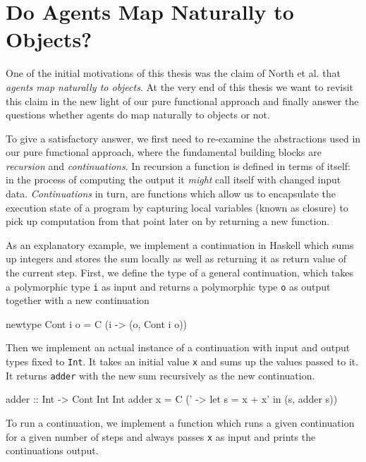\section{Do Agents Map Naturally to Objects?}
\label{sec:agents_to_objects}
One of the initial motivations of this thesis was the claim of North et al. \cite{north_managing_2007} that \textit{agents map naturally to objects}. At the very end of this thesis we want to revisit this claim in the new light of our pure functional approach and finally answer the questions whether agents do map naturally to objects or not.

\medskip

To give a satisfactory answer, we first need to re-examine the abstractions used in our pure functional approach, where the fundamental building blocks are \textit{recursion} and \textit{continuations}. In recursion a function is defined in terms of itself: in the process of computing the output it \textit{might} call itself with changed input data. \textit{Continuations} in turn, are functions which allow us to encapsulate the execution state of a program by capturing local variables (known as closure) to pick up computation from that point later on by returning a new function.

As an explanatory example, we implement a continuation in Haskell which sums up integers and stores the sum locally as well as returning it as return value of the current step. First, we define the type of a general continuation, which takes a polymorphic type \texttt{i} as input and returns a polymorphic type \texttt{o} as output together with a new continuation

\begin{HaskellCode}
newtype Cont i o = C (i -> (o, Cont i o))
\end{HaskellCode}

Then we implement an actual instance of a continuation with input and output types fixed to \texttt{Int}. It takes an initial value \texttt{x} and sums up the values passed to it. It returns \texttt{adder} with the new sum recursively as the new continuation.

\begin{HaskellCode}
adder :: Int -> Cont Int Int
adder x = C (\x' -> let s = x + x' in
                    (s, adder s))
\end{HaskellCode}

To run a continuation, we implement a function which runs a given continuation for a given number of steps and always passes \texttt{x} as input and prints the continuations output.


